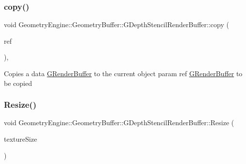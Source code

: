 \mbox{\label{class_geometry_engine_1_1_geometry_buffer_1_1_g_depth_stencil_render_buffer_a85aeb8570c83b53e47c42fe1310bd5f1}} 
\subsubsection{\texorpdfstring{copy()}{copy()}}
{\footnotesize\ttfamily void Geometry\+Engine\+::\+Geometry\+Buffer\+::\+G\+Depth\+Stencil\+Render\+Buffer\+::copy (\begin{DoxyParamCaption}\item[{const \mbox{\hyperlink{class_geometry_engine_1_1_geometry_buffer_1_1_g_depth_stencil_render_buffer}{G\+Depth\+Stencil\+Render\+Buffer}} \&}]{ref }\end{DoxyParamCaption})\hspace{0.3cm}{\ttfamily [protected]}, {\ttfamily [virtual]}}

Copies a data \mbox{\hyperlink{class_geometry_engine_1_1_geometry_buffer_1_1_g_render_buffer}{G\+Render\+Buffer}} to the current object param ref \mbox{\hyperlink{class_geometry_engine_1_1_geometry_buffer_1_1_g_render_buffer}{G\+Render\+Buffer}} to be copied \mbox{\label{class_geometry_engine_1_1_geometry_buffer_1_1_g_depth_stencil_render_buffer_aee7b6a5ecc14a2aac4c6f363fa609720}} 
\subsubsection{\texorpdfstring{Resize()}{Resize()}}
{\footnotesize\ttfamily void Geometry\+Engine\+::\+Geometry\+Buffer\+::\+G\+Depth\+Stencil\+Render\+Buffer\+::\+Resize (\begin{DoxyParamCaption}\item[{const Q\+Vector2D \&}]{texture\+Size }\end{DoxyParamCaption})\hspace{0.3cm}{\ttfamily [virtual]}}

